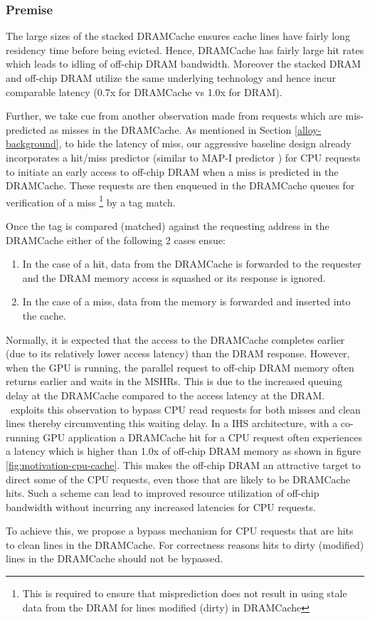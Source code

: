 \subsubsection{Premise}
The large sizes of the stacked DRAMCache ensures cache lines have fairly long residency time before being evicted. Hence, DRAMCache has fairly large hit rates which leads to idling of off-chip DRAM bandwidth. Moreover the stacked DRAM and off-chip DRAM utilize the same underlying technology and hence incur comparable latency (0.7x for DRAMCache vs 1.0x for DRAM). 
\par Further, we take cue from another observation made from requests which are mis-predicted as misses in the DRAMCache. As mentioned in Section \ref{alloy-background}, to hide the latency of miss, our aggressive baseline design already incorporates a hit/miss predictor (similar to MAP-I predictor \cite{alloy}) for CPU requests to initiate an early access to off-chip DRAM when a miss is predicted in the DRAMCache. These requests are then enqueued in the DRAMCache queues for verification of a miss 
\footnote{This is required to ensure that misprediction does not result in using stale data from the DRAM for lines modified (dirty) in DRAMCache}
by a tag match. 

Once the tag is compared (matched) against the requesting address in the DRAMCache either of the following 2 cases ensue: 
\begin{enumerate}[label=(\alph*)]
	\item In the case of a hit, data from the DRAMCache is forwarded to the requester and the DRAM memory access is squashed or its response is ignored. 
	\item In the case of a miss, data from the memory is forwarded and inserted into the cache.
\end{enumerate}
Normally, it is expected that the access to the DRAMCache completes earlier (due to its relatively lower access latency) than the DRAM response. However, when the GPU is running, the parallel request to off-chip DRAM memory often returns earlier and waits in the MSHRs. This is due to the increased queuing delay at the DRAMCache compared to the access latency at the DRAM. \cachename\ exploits this observation to bypass CPU read requests for both misses and clean lines thereby circumventing this waiting delay.
In a IHS architecture, with a co-running GPU application a DRAMCache hit for a CPU request often experiences a latency which is higher than 1.0x of off-chip DRAM memory as shown in figure \ref{fig:motivation-cpu-cache}. 
This makes the off-chip DRAM an attractive target to direct some of the CPU requests, even those that are likely to be DRAMCache hits. Such a scheme can lead to improved resource utilization of off-chip bandwidth without incurring any increased latencies for CPU requests.
\par To achieve this, we propose a bypass mechanism for CPU requests that are hits to clean lines in the DRAMCache. For correctness reasons hits to dirty (modified) lines in the DRAMCache should not be bypassed.


